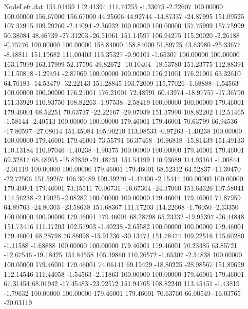 \begin{filecontents}{NodeLeft.dat}
 151.04459  112.41394  111.74255    -1.33075   -2.22607  100.00000  100.00000  156.67000  156.67000   44.25606   44.92744  -14.87337  -24.87995
 151.09525  107.37915  109.29260    -2.44094   -2.36932  100.00000  100.00000  157.75999  157.75999   50.38084   48.46739  -27.31203  -26.51061
 151.14597  106.94275  115.20020    -2.26188   -0.75776  100.00000  100.00000  158.84000  158.84000   51.89725   43.63980  -25.33677   -8.48811
 151.19682  111.00403  113.35327    -0.90101   -1.65307  100.00000  100.00000  163.17999  163.17999   52.17596   49.82672  -10.10404  -18.53780
 151.23775  112.88391  111.50818    -1.29494   -2.87069  100.00000  100.00000  176.21001  176.21001   63.32610   64.70183  -14.53479  -32.22143
 151.28845  103.72009  115.77026    -1.68888   -1.54563  100.00000  100.00000  176.21001  176.21001   72.48991   60.43974  -18.97757  -17.36790
 151.33929  110.93750  108.82263    -1.97538   -2.58419  100.00000  100.00000  179.46001  179.46001   68.52251   70.63737  -22.22167  -29.07039
 151.37990  108.82202  112.51465    -1.58144   -2.40513  100.00000  100.00000  179.46001  179.46001   70.63799   66.94536  -17.80597  -27.08014
 151.45084  105.90210  113.08533    -0.97263   -1.40238  100.00000  100.00000  179.46001  179.46001   73.55791   66.37468  -10.96818  -15.81439
 151.49133  110.13184  110.97046    -1.40238   -1.90375  100.00000  100.00000  179.46001  179.46001   69.32817   68.48955  -15.82839  -21.48731
 151.54199  110.93689  114.93164    -1.00844   -2.01119  100.00000  100.00000  179.46001  179.46001   68.52312   64.52837  -11.39470  -22.72506
 151.59267  106.30489  109.39270    -1.47400   -2.15444  100.00000  100.00000  179.46001  179.46001   73.15511   70.06731  -16.67364  -24.37060
 151.64326  107.58041  114.56238    -2.19025   -2.08282  100.00000  100.00000  179.46001  179.46001   71.87959   64.89763  -24.80303  -23.58638
 151.68367  111.17203  114.22668    -1.76050   -2.33350  100.00000  100.00000  179.46001  179.46001   68.28798   65.23332  -19.95397  -26.44848
 151.73416  111.17203  102.57903    -1.40238   -2.65582  100.00000  100.00000  179.46001  179.46001   68.28798   76.88098  -15.91236  -30.13471
 151.78474  109.22516  115.60280    -1.11588   -1.68888  100.00000  100.00000  179.46001  179.46001   70.23485   63.85721  -12.67546  -19.18425
 151.84558  105.39860  110.26572    -1.65307   -2.54838  100.00000  100.00000  179.46001  179.46001   74.06141   69.19429  -18.80225  -28.98567
 151.89629  112.14546  111.44058    -1.54563   -2.11863  100.00000  100.00000  179.46001  179.46001   67.31454   68.01942  -17.45483  -23.92572
 151.94705  108.82240  113.45451    -1.43819   -1.79632  100.00000  100.00000  179.46001  179.46001   70.63760   66.00549  -16.03765  -20.03119

\end{filecontents}
